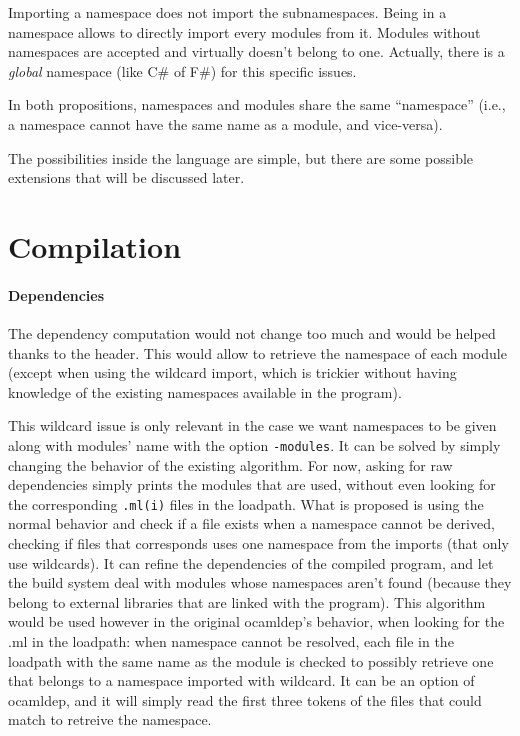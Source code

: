 \documentclass[11pt,a4paper]{article}
\begin{document}
Importing a namespace does not import the subnamespaces. Being in a namespace
allows to directly import every modules from it. Modules without namespaces are
accepted and virtually doesn't belong to one. Actually, there is a \emph{global}
namespace (like C\# of F\#) for this specific issues.


In both propositions, namespaces and modules share the same ``namespace'' (i.e.,
a namespace cannot have the same name as a module, and vice-versa).

The possibilities inside the language are simple, but there are some possible
extensions that will be discussed later.

\section{Compilation}

\paragraph{Dependencies}

The dependency computation would not change too much and would be helped thanks
to the header. This would allow to retrieve the namespace of each module (except
when using the wildcard import, which is trickier without having knowledge of
the existing namespaces available in the program).

This wildcard issue is only relevant in the case we want namespaces to be given
along with modules' name with the option \texttt{-modules}. It can be solved by
simply changing the behavior of the existing algorithm. For now, asking for raw
dependencies simply prints the modules that are used, without even looking for
the corresponding \texttt{.ml(i)} files in the loadpath. What is proposed is
using the normal behavior and check if a file exists when a namespace cannot be
derived, checking if files that corresponds uses one namespace from the imports
(that only use wildcards). It can refine the dependencies of the compiled
program, and let the build system deal with modules whose namespaces aren't
found (because they belong to external libraries that are linked with the
program). This algorithm would be used however in the original ocamldep's
behavior, when looking for the .ml in the loadpath: when namespace cannot be
resolved, each file in the loadpath with the same name as the module is checked
to possibly retrieve one that belongs to a namespace imported with wildcard. It
can be an option of ocamldep, and it will simply read the first three tokens of
the files that could match to retreive the namespace.
\end{document}
